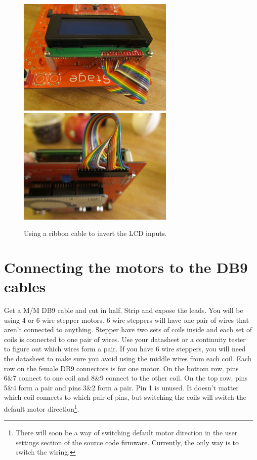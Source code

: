 \documentclass[11pt]{report} %
\begin{document}
\begin{figure}[!ht]
\centering
\includegraphics[width=3in]{IMG_3230.JPG}
\includegraphics[width=3in]{IMG_3231.JPG}
\caption{Using a ribbon cable to invert the LCD inputs.}
\label{ribbon}
\end{figure}

\clearpage

\section{Connecting the motors to the DB9 cables}
Get a M/M DB9 cable and cut in half. Strip and expose the leads. You will be using 4 or 6 wire stepper motors. 6 wire steppers will have one pair of wires that aren't connected to anything. Stepper have two sets of coils inside and each set of coils is connected to one pair of wires. Use your datasheet or a continuity tester to figure out which wires form a pair. If you have 6 wire steppers, you will need the datasheet to make sure you avoid using the middle wires from each coil. Each row on the female DB9 connectors is for one motor. On the bottom row, pins 6\&7 connect to one coil and 8\&9 connect to the other coil. On the top row, pins 5\&4 form a pair and pins 3\&2 form a pair. Pin 1 is unused. It doesn't matter which coil connects to which pair of pins, but switching the coils will switch the default motor direction\footnote{There will soon be a way of switching default motor direction in the user settings section of the source code firmware. Currently, the only way is to switch the wiring.}.
\end{document}
